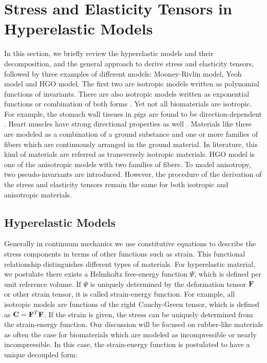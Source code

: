 \section{Stress and Elasticity Tensors in Hyperelastic Models} \label{general}
In this section, we briefly review the hyperelastic models and their decomposition, and the general approach to derive stress and elasticity tensors, followed by three examples of different models: Mooney-Rivlin model, Yeoh model and HGO model. The first two are isotropic models written as polynomial functions of invariants. There are also isotropic models written as exponential functions or combination of both forms \cite{Fung5, Demiray, Westmann}. 
Yet not all biomaterials are isotropic. For example, the stomach wall tissues in pigs are found to be direction-dependent \cite{Zhao}. Heart muscles have strong directional properties as well \cite{Ramesh}. Materials like these are modeled as a combination of a ground substance and one or more families of fibers which are continuously arranged in the ground material. In literature, this kind of materials are referred as transversely isotropic materials. HGO model is one of the anisotropic models with two families of fibers. To model anisotropy, two pseudo-invariants are introduced. However, the procedure of the derivation of the stress and elasticity tensors remain the same for both isotropic and anisotropic materials.

%
\subsection{Hyperelastic Models}
Generally in continuum mechanics we use constitutive equations to describe the stress components in terms of other functions such as strain. This functional relationship distinguishes different types of materials. For hyperelastic material, we postulate there exists a Helmholtz free-energy function $\Psi$, which is defined per unit reference volume. If $\Psi$ is uniquely determined by the deformation tensor $\bold{F}$ or other strain tensor, it is called strain-energy function. For example, all isotropic models are functions of the right Cauchy-Green tensor, which is defined as $\bold{C} = {\bold{F}}^T{\bold{F}}$. If the strain is given, the stress can be uniquely determined from the strain-energy function. Our discussion will be focused on rubber-like materials as often the case for biomaterials which are modeled as incompressible or nearly incompressible. In this case, the strain-energy function is postulated to have a unique decoupled form:

